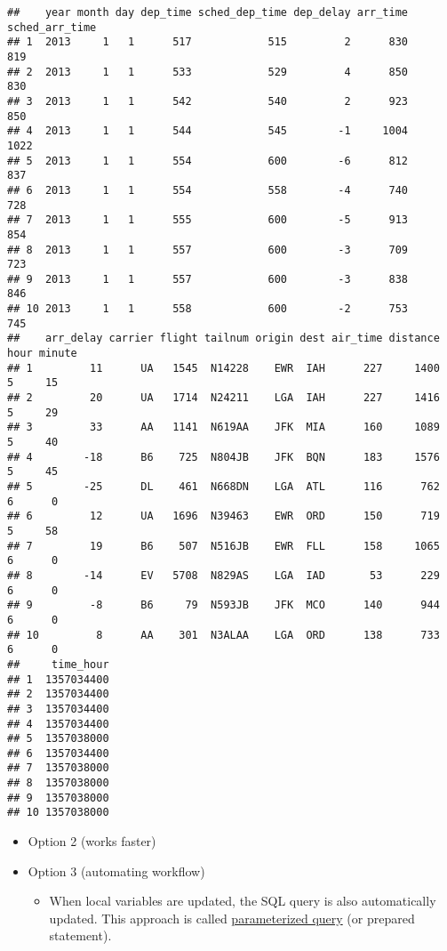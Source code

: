 \documentclass[
]{book}
\providecommand{\tightlist}{%
  \setlength{\itemsep}{0pt}\setlength{\parskip}{0pt}}
\begin{document}
\begin{verbatim}
##    year month day dep_time sched_dep_time dep_delay arr_time sched_arr_time
## 1  2013     1   1      517            515         2      830            819
## 2  2013     1   1      533            529         4      850            830
## 3  2013     1   1      542            540         2      923            850
## 4  2013     1   1      544            545        -1     1004           1022
## 5  2013     1   1      554            600        -6      812            837
## 6  2013     1   1      554            558        -4      740            728
## 7  2013     1   1      555            600        -5      913            854
## 8  2013     1   1      557            600        -3      709            723
## 9  2013     1   1      557            600        -3      838            846
## 10 2013     1   1      558            600        -2      753            745
##    arr_delay carrier flight tailnum origin dest air_time distance hour minute
## 1         11      UA   1545  N14228    EWR  IAH      227     1400    5     15
## 2         20      UA   1714  N24211    LGA  IAH      227     1416    5     29
## 3         33      AA   1141  N619AA    JFK  MIA      160     1089    5     40
## 4        -18      B6    725  N804JB    JFK  BQN      183     1576    5     45
## 5        -25      DL    461  N668DN    LGA  ATL      116      762    6      0
## 6         12      UA   1696  N39463    EWR  ORD      150      719    5     58
## 7         19      B6    507  N516JB    EWR  FLL      158     1065    6      0
## 8        -14      EV   5708  N829AS    LGA  IAD       53      229    6      0
## 9         -8      B6     79  N593JB    JFK  MCO      140      944    6      0
## 10         8      AA    301  N3ALAA    LGA  ORD      138      733    6      0
##     time_hour
## 1  1357034400
## 2  1357034400
## 3  1357034400
## 4  1357034400
## 5  1357038000
## 6  1357034400
## 7  1357038000
## 8  1357038000
## 9  1357038000
## 10 1357038000
\end{verbatim}

\begin{itemize}
\item
  Option 2 (works faster)
\item
  Option 3 (automating workflow)

  \begin{itemize}
  \tightlist
  \item
    When local variables are updated, the SQL query is also automatically updated. This approach is called \href{https://www.php.net/manual/en/pdo.prepared-statements.php}{parameterized query} (or prepared statement).
  \end{itemize}
\end{itemize}
\end{document}
